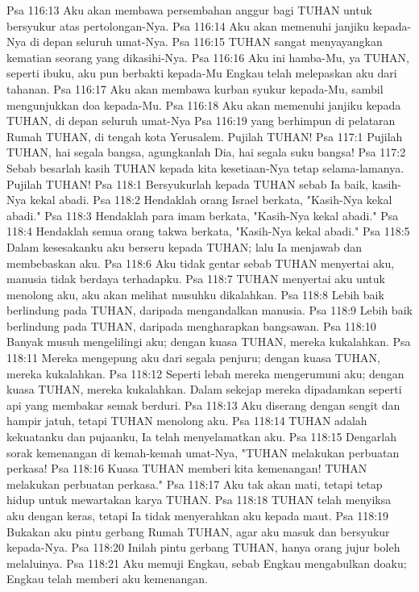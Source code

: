 Psa 116:13  Aku akan membawa persembahan anggur bagi TUHAN untuk bersyukur atas pertolongan-Nya.
Psa 116:14  Aku akan memenuhi janjiku kepada-Nya di depan seluruh umat-Nya.
Psa 116:15  TUHAN sangat menyayangkan kematian seorang yang dikasihi-Nya.
Psa 116:16  Aku ini hamba-Mu, ya TUHAN, seperti ibuku, aku pun berbakti kepada-Mu Engkau telah melepaskan aku dari tahanan.
Psa 116:17  Aku akan membawa kurban syukur kepada-Mu, sambil mengunjukkan doa kepada-Mu.
Psa 116:18  Aku akan memenuhi janjiku kepada TUHAN, di depan seluruh umat-Nya
Psa 116:19  yang berhimpun di pelataran Rumah TUHAN, di tengah kota Yerusalem. Pujilah TUHAN!
Psa 117:1  Pujilah TUHAN, hai segala bangsa, agungkanlah Dia, hai segala suku bangsa!
Psa 117:2  Sebab besarlah kasih TUHAN kepada kita kesetiaan-Nya tetap selama-lamanya. Pujilah TUHAN!
Psa 118:1  Bersyukurlah kepada TUHAN sebab Ia baik, kasih-Nya kekal abadi.
Psa 118:2  Hendaklah orang Israel berkata, "Kasih-Nya kekal abadi."
Psa 118:3  Hendaklah para imam berkata, "Kasih-Nya kekal abadi."
Psa 118:4  Hendaklah semua orang takwa berkata, "Kasih-Nya kekal abadi."
Psa 118:5  Dalam kesesakanku aku berseru kepada TUHAN; lalu Ia menjawab dan membebaskan aku.
Psa 118:6  Aku tidak gentar sebab TUHAN menyertai aku, manusia tidak berdaya terhadapku.
Psa 118:7  TUHAN menyertai aku untuk menolong aku, aku akan melihat musuhku dikalahkan.
Psa 118:8  Lebih baik berlindung pada TUHAN, daripada mengandalkan manusia.
Psa 118:9  Lebih baik berlindung pada TUHAN, daripada mengharapkan bangsawan.
Psa 118:10  Banyak musuh mengelilingi aku; dengan kuasa TUHAN, mereka kukalahkan.
Psa 118:11  Mereka mengepung aku dari segala penjuru; dengan kuasa TUHAN, mereka kukalahkan.
Psa 118:12  Seperti lebah mereka mengerumuni aku; dengan kuasa TUHAN, mereka kukalahkan. Dalam sekejap mereka dipadamkan seperti api yang membakar semak berduri.
Psa 118:13  Aku diserang dengan sengit dan hampir jatuh, tetapi TUHAN menolong aku.
Psa 118:14  TUHAN adalah kekuatanku dan pujaanku, Ia telah menyelamatkan aku.
Psa 118:15  Dengarlah sorak kemenangan di kemah-kemah umat-Nya, "TUHAN melakukan perbuatan perkasa!
Psa 118:16  Kuasa TUHAN memberi kita kemenangan! TUHAN melakukan perbuatan perkasa."
Psa 118:17  Aku tak akan mati, tetapi tetap hidup untuk mewartakan karya TUHAN.
Psa 118:18  TUHAN telah menyiksa aku dengan keras, tetapi Ia tidak menyerahkan aku kepada maut.
Psa 118:19  Bukakan aku pintu gerbang Rumah TUHAN, agar aku masuk dan bersyukur kepada-Nya.
Psa 118:20  Inilah pintu gerbang TUHAN, hanya orang jujur boleh melaluinya.
Psa 118:21  Aku memuji Engkau, sebab Engkau mengabulkan doaku; Engkau telah memberi aku kemenangan.
